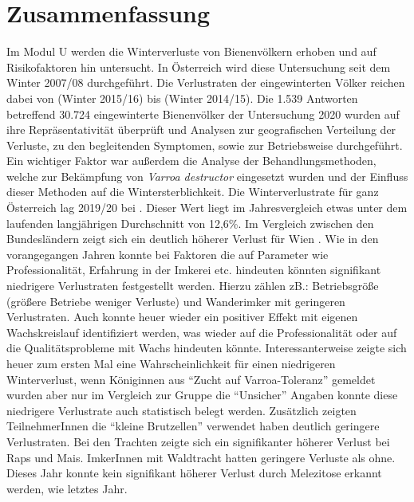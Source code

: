 \section{Zusammenfassung}
Im Modul U werden die Winterverluste von Bienenvölkern erhoben und auf Risikofaktoren hin untersucht. In Österreich wird diese Untersuchung seit dem Winter 2007/08 durchgeführt. Die Verlustraten der eingewinterten Völker reichen dabei von  (Winter 2015/16) bis  (Winter 2014/15). 
\newline
Die 1.539 Antworten betreffend 30.724 eingewinterte Bienenvölker der Untersuchung 2020 wurden auf ihre Repräsentativität überprüft und Analysen zur geografischen Verteilung der Verluste, zu den begleitenden Symptomen, sowie zur Betriebsweise durchgeführt. Ein wichtiger Faktor war außerdem die Analyse der Behandlungsmethoden, welche zur Bekämpfung von \textit{Varroa destructor} eingesetzt wurden und der Einfluss dieser Methoden auf die Wintersterblichkeit.
\newline
Die Winterverlustrate für ganz Österreich lag 2019/20 bei . Dieser Wert liegt im Jahresvergleich etwas unter dem laufenden langjährigen Durchschnitt von 12,6\%. Im Vergleich zwischen den Bundesländern zeigt sich ein deutlich höherer Verlust für Wien .
\newline
Wie in den vorangegangen Jahren konnte bei Faktoren die auf Parameter wie Professionalität, Erfahrung in der Imkerei etc. hindeuten könnten signifikant niedrigere Verlustraten festgestellt werden. Hierzu zählen zB.: Betriebsgröße (größere Betriebe weniger Verluste) und Wanderimker mit geringeren Verlustraten. Auch konnte heuer wieder ein positiver Effekt mit eigenen Wachskreislauf identifiziert werden, was wieder auf die Professionalität oder auf die Qualitätsprobleme mit Wachs hindeuten könnte. 
\newline
Interessanterweise zeigte sich heuer zum ersten Mal eine Wahrscheinlichkeit für einen niedrigeren Winterverlust, wenn Königinnen aus \enquote{Zucht auf Varroa-Toleranz} gemeldet wurden aber nur im Vergleich zur Gruppe die \enquote{Unsicher} Angaben konnte diese niedrigere Verlustrate auch statistisch belegt werden. Zusätzlich zeigten TeilnehmerInnen die \enquote{kleine Brutzellen} verwendet haben deutlich geringere Verlustraten.
\newline
Bei den Trachten zeigte sich ein signifikanter höherer Verlust bei Raps und Mais. ImkerInnen mit Waldtracht hatten geringere Verluste als ohne. Dieses Jahr konnte kein signifikant höherer Verlust durch Melezitose erkannt werden, wie letztes Jahr. 
